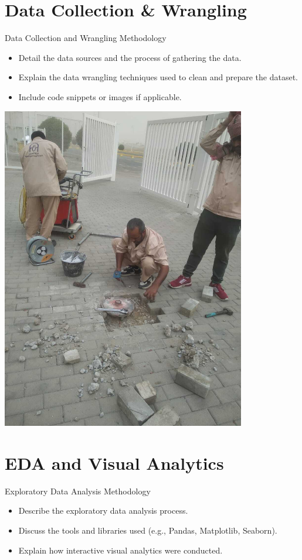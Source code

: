 \documentclass{beamer}
\begin{document}
\section{Data Collection \& Wrangling}
\begin{frame}{Data Collection and Wrangling Methodology}
    \begin{itemize}
        \item Detail the data sources and the process of gathering the data.
        \item Explain the data wrangling techniques used to clean and prepare the dataset.
        \item Include code snippets or images if applicable.
    \end{itemize}
    \includegraphics[width=0.8\textwidth]{images/data_wrangling.jpg}
\end{frame}

\section{EDA and Visual Analytics}
\begin{frame}{Exploratory Data Analysis Methodology}
    \begin{itemize}
        \item Describe the exploratory data analysis process.
        \item Discuss the tools and libraries used (e.g., Pandas, Matplotlib, Seaborn).
        \item Explain how interactive visual analytics were conducted.
    \end{itemize}
\end{frame}
\end{document}
